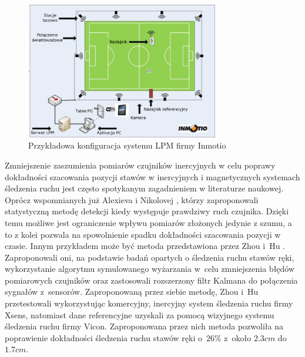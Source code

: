\begin{savenotes}
	\begin{figure}[!htb]
		\centering	
		\includegraphics[width=0.75\textwidth]{images/lpm.png}
		\caption[Przykładowa konfiguracja systemu LPM firmy Inmotio]{Przykładowa konfiguracja systemu LPM firmy Inmotio}	
		\label{fig:literature:footnote:inmotio:setup}	
	\end{figure}
\end{savenotes}

Zmniejszenie zaszumienia pomiarów czujników inercyjnych w celu poprawy dokładności szacowania pozycji stawów w inercyjnych i magnetycznych systemach śledzenia ruchu jest często spotykanym zagadnieniem w literaturze naukowej. Oprócz wspomnianych już Alexieva i Nikolovej \cite{Alexiev2013}, którzy zaproponowali statystyczną metodę detekcji kiedy występuje prawdziwy ruch czujnika. Dzięki temu możliwe jest ograniczenie wpływu pomiarów złożonych jedynie z szumu, a to z kolei pozwala na spowolnienie spadku dokładności szacowania pozycji w czasie. Innym przykładem może być metoda przedstawiona przez Zhou i~Hu \cite{Zhou2005,Zhou2006}. Zaproponowali oni, na podstawie badań opartych o śledzenia ruchu stawów ręki, wykorzystanie algorytmu symulowanego wyżarzania w~celu zmniejszenia błędów pomiarowych czujników oraz zastosowali rozszerzony filtr Kalmana do połączenia sygnałów z~sensorów. Zaproponowaną przez siebie metodę, Zhou i~Hu przetestowali wykorzystując komercyjny, inercyjny system śledzenia ruchu firmy Xsens, natomiast dane referencyjne uzyskali za pomocą wizyjnego systemu śledzenia ruchu firmy Vicon. Zaproponowana przez nich metoda pozwoliła na poprawienie dokładności śledzenia ruchu stawów ręki o~$26\%$ z~około $2.3 cm$ do $1.7 cm$.
							
